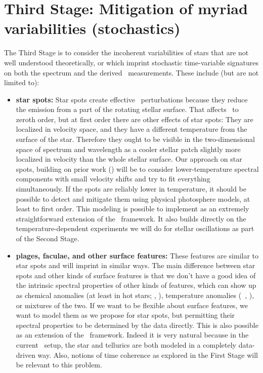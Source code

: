 \documentclass[12pt, letterpaper]{article}
\begin{document}
\section{Third Stage: Mitigation of myriad variabilities (stochastics)}

The Third Stage is to consider the incoherent variabilities of stars
that are not well understood theoretically, or which imprint
stochastic time-variable signatures on both the spectrum and the
derived \RV\ measurements.
These include (but are not limited to):
\begin{itemize}
\item
\textbf{star spots:}
Star spots create effective \RV\ perturbations because they reduce the
emission from a part of the rotating stellar surface.
That affects \EPRV\ to zeroth order, but at first order there are other
effects of star spots:
They are localized in velocity space, and they have a different
temperature from the surface of the star.
Therefore they ought to be visible in the two-dimensional space of
spectrum and wavelength as a cooler stellar patch slightly more
localized in velocity than the whole stellar surface.
Our approach on star spots, building on prior work (\citealt{Gully}) will
be to consider lower-temperature spectral components with small
velocity shifts and try to fit everything simultaneously.
If the spots are reliably lower in temperature, it should be possible
to detect and mitigate them using physical photosphere models, at
least to first order.
This modeling is possible to implement as an extremely straightforward
extension of the \wobble\ framework. 
It also builds directly on the temperature-dependent experiments we will do
for stellar oscillations as part of the Second Stage.
\item
\textbf{plages, faculae, and other surface features:}
These features are similar to star spots and will imprint in similar
ways.
The main difference between star spots and other kinds of surface
features is that we don't have a good idea of the intrinsic spectral
properties of other kinds of features, which can show up as chemical
anomalies (at least in hot stars; \eg, \citealt{doppler}),
temperature anomalies (\eg\ \citealt{Gully}, \citealt{Milbourne2019}),
or mixtures of the two.
If we want to be flexible about surface features, we want to model
them as we propose for star spots, but permitting their spectral
properties to be determined by the data directly.
This is also possible as an extension of the \wobble\ framework.
Indeed it is very natural because in the current \wobble\ setup, the
star and tellurics are both modeled in a completely data-driven way. 
Also, notions of time coherence as explored in the First Stage will be 
relevant to this problem.


\end{itemize}
\end{document}
